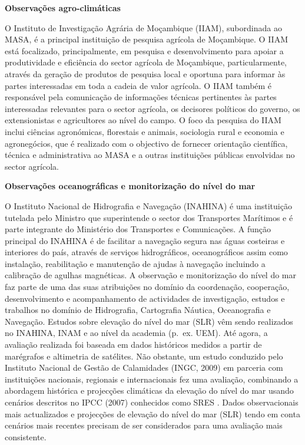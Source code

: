 \documentclass[
]{book}
\begin{document}
\textbf{Observações agro-climáticas}

O Instituto de Investigação Agrária de Moçambique (IIAM), subordinada ao MASA, é a principal instituição de pesquisa agrícola de Moçambique. O IIAM está focalizado, principalmente, em pesquisa e desenvolvimento para apoiar a produtividade e eficiência do sector agrícola de Moçambique, particularmente, através da geração de produtos de pesquisa local e oportuna para informar às partes interessadas em toda a cadeia de valor agrícola. O IIAM também é responsável pela comunicação de informações técnicas pertinentes às partes interessadas relevantes para o sector agrícola, os decisores políticos do governo, os extensionistas e agricultores ao nível do campo. O foco da pesquisa do IIAM inclui ciências agronómicas, florestais e animais, sociologia rural e economia e agronegócios, que é realizado com o objectivo de fornecer orientação científica, técnica e administrativa ao MASA e a outras instituições públicas envolvidas no sector agrícola.

\textbf{Observações oceanográficas e monitorização do nível do mar}

O Instituto Nacional de Hidrografia e Navegação (INAHINA) é uma instituição tutelada pelo Ministro que superintende o sector dos Transportes Marítimos e é parte integrante do Ministério dos Transportes e Comunicações. A função principal do INAHINA é de facilitar a navegação segura nas águas costeiras e interiores do país, através de serviços hidrográficos, oceanográficos assim como instalação, reabilitação e manutenção de ajudas à navegação incluindo a calibração de agulhas magnéticas. A observação e monitorização do nível do mar faz parte de uma das suas atribuições no domínio da coordenação, cooperação, desenvolvimento e acompanhamento de actividades de investigação, estudos e trabalhos no domínio de Hidrografia, Cartografia Náutica, Oceanografia e Navegação. Estudos sobre elevação do nível do mar (SLR) vêm sendo realizados no INAHINA, INAM e ao nível da academia (p.~ex. UEM). Até agora, a avaliação realizada foi baseada em dados históricos medidos a partir de marégrafos e altimetria de satélites. Não obstante, um estudo conduzido pelo Instituto Nacional de Gestão de Calamidades (INGC, 2009) em parceria com instituições nacionais, regionais e internacionais fez uma avaliação, combinando a abordagem histórica e projecções climáticas da elevação do nível do mar usando cenários descritos no IPCC (2007) conhecidos como SRES . Dados observacionais mais actualizados e projecções de elevação do nível do mar (SLR) tendo em conta cenários mais recentes precisam de ser considerados para uma avaliação mais consistente.
\end{document}
